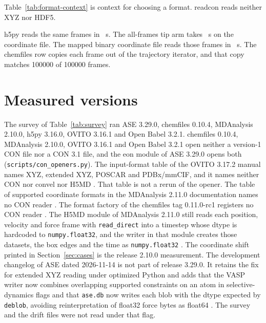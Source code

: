 \documentclass[preprint,12pt]{elsarticle}
\begin{document}
Table~\ref{tab:format-context} is context for choosing a format.
readcon reads neither XYZ nor HDF5.

h5py reads the same frames in \rcHdfMedian~s.
The all-frames tip arm takes \rcTipMedian~s on the coordinate file.
The mapped binary coordinate file reads those frames in \rcConbinMedian~s.
The chemfiles row copies each frame out of the trajectory iterator, and that copy matches 100000 of 100000 frames.



\section{Measured versions}\label{sec:supp-versions} The survey of Table~\ref{tab:survey} ran ASE 3.29.0, chemfiles 0.10.4, MDAnalysis 2.10.0, h5py 3.16.0, OVITO 3.16.1 and Open Babel 3.2.1.
chemfiles 0.10.4, MDAnalysis 2.10.0, OVITO 3.16.1 and Open Babel 3.2.1 open neither a version-1 CON file nor a CON 3.1 file, and the eon module of ASE 3.29.0 opens both (\texttt{scripts/\allowbreak con\_\allowbreak openers.py}).
The input-format table of the OVITO 3.17.2 manual names XYZ, extended XYZ, POSCAR and PDBx/mmCIF, and it names neither CON nor convel nor H5MD \cite{ovitoManual3172}.
That table is not a rerun of the opener.
The table of supported coordinate formats in the MDAnalysis 2.11.0 documentation names no CON reader \cite{gowersMdanalysisCoords2110}.
The format factory of the chemfiles tag 0.11.0-rc1 registers no CON reader \cite{frauxChemfiles0110rc12025}.
The H5MD module of MDAnalysis 2.11.0 still reads each position, velocity and force frame with \texttt{read\_direct} into a timestep whose dtype is hardcoded to \texttt{numpy.float32}, and the writer in that module creates those datasets, the box edges and the time as \texttt{numpy.float32} \cite{gowersMdanalysis21102026,gowersMdanalysisH5md2110}.
The coordinate shift printed in Section~\ref{sec:cases} is the release 2.10.0 measurement.
The development changelog of ASE dated 2026-11-14 is not part of release 3.29.0. It retains the fix for extended XYZ reading under optimized Python and adds that the VASP writer now combines overlapping supported constraints on an atom in selective-dynamics flags and that \texttt{ase.db} now writes each blob with the dtype expected by \texttt{deblob}, avoiding reinterpretation of float32 force bytes as float64 \cite{aseChangelog20261114}.
The survey and the drift files were not read under that flag.
\end{document}
